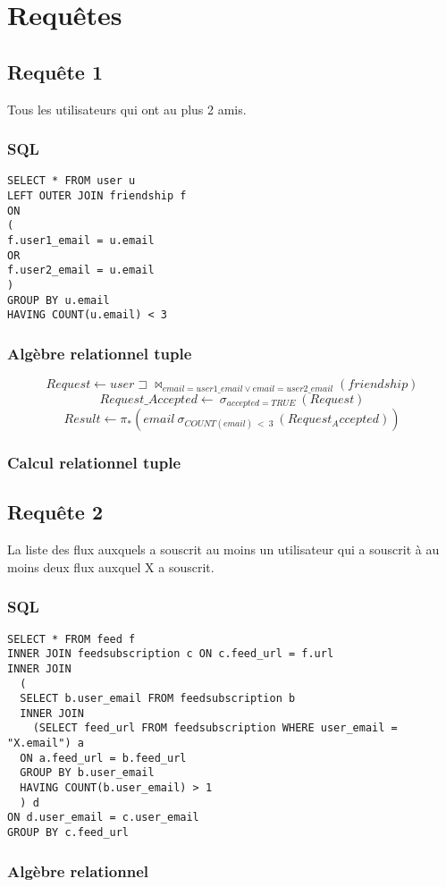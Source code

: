 \documentclass[a4paper,10pt]{article}
\begin{document}
\section{Requêtes}
\subsection{Requête 1}
Tous les utilisateurs qui ont au plus 2 amis.
\subsubsection{SQL}
\begin{lstlisting}
SELECT * FROM user u
LEFT OUTER JOIN friendship f
ON
(
f.user1_email = u.email
OR
f.user2_email = u.email
)
GROUP BY u.email
HAVING COUNT(u.email) < 3
\end{lstlisting}
\subsubsection{Algèbre relationnel tuple}
$$Request \leftarrow user\sqsupset\Join_{email=user1\_email \vee email=user2\_email}( friendship)$$
$$Request\_Accepted \leftarrow\ \sigma_{accepted=TRUE}\ (Request)$$
$$Result \leftarrow \pi_* (email\ \sigma_{COUNT(email)\ <\ 3}\ (Request_Accepted) )$$
\subsubsection{Calcul relationnel tuple}
\clearpage
\subsection{Requête 2}
La liste des flux auxquels a souscrit au moins un utilisateur qui a souscrit à au moins deux flux auxquel X
a souscrit.
\subsubsection{SQL}
\begin{lstlisting}
SELECT * FROM feed f
INNER JOIN feedsubscription c ON c.feed_url = f.url
INNER JOIN 
  (
  SELECT b.user_email FROM feedsubscription b 
  INNER JOIN 
    (SELECT feed_url FROM feedsubscription WHERE user_email = "X.email") a
  ON a.feed_url = b.feed_url 
  GROUP BY b.user_email
  HAVING COUNT(b.user_email) > 1
  ) d
ON d.user_email = c.user_email
GROUP BY c.feed_url
\end{lstlisting}
\subsubsection{Algèbre relationnel}
\end{document}
